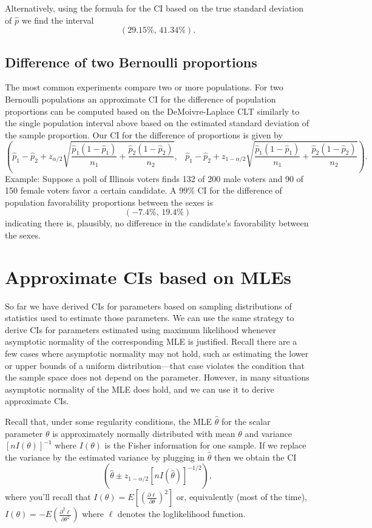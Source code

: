 \documentclass[
]{book}
\begin{document}
Alternatively, using the formula for the CI based on the true standard deviation of \(\hat p\) we find the interval
\[(29.15\%, \, 41.34\%).\]

\hypertarget{difference-of-two-bernoulli-proportions}{%
\subsection{Difference of two Bernoulli proportions}\label{difference-of-two-bernoulli-proportions}}

The most common experiments compare two or more populations. For two Bernoulli populations an approximate CI for the difference of population proportions can be computed based on the DeMoivre-Laplace CLT similarly to the single population interval above based on the estimated standard deviation of the sample proportion. Our CI for the difference of proportions is given by
\[\left(\hat p_1 - \hat p_2 + z_{\alpha/2}\sqrt{\frac{\hat p_1(1-\hat p_1)}{n_1} + \frac{\hat p_2(1-\hat p_2)}{n_2}}, \,\,\,\,\, \hat p_1 - \hat p_2 + z_{1-\alpha/2}\sqrt{\frac{\hat p_1(1-\hat p_1)}{n_1} + \frac{\hat p_2(1-\hat p_2)}{n_2}}\right).\]
Example: Suppose a poll of Illinois voters finds 132 of 200 male voters and 90 of 150 female voters favor a certain candidate. A \(99\%\) CI for the difference of population favorability proportions between the sexes is
\[(-7.4\%, \, 19.4\%)\]
indicating there is, plausibly, no difference in the candidate's favorability between the sexes.

\hypertarget{approximate-cis-based-on-mles}{%
\section{Approximate CIs based on MLEs}\label{approximate-cis-based-on-mles}}

So far we have derived CIs for parameters based on sampling distributions of statistics used to estimate those parameters. We can use the same strategy to derive CIs for parameters estimated using maximum likelihood whenever asymptotic normality of the corresponding MLE is justified. Recall there are a few cases where asymptotic normality may not hold, such as estimating the lower or upper bounds of a uniform distribution---that case violates the condition that the sample space does not depend on the parameter. However, in many situations asymptotic normality of the MLE does hold, and we can use it to derive approximate CIs.

Recall that, under some regularity conditions, the MLE \(\hat\theta\) for the scalar parameter \(\theta\) is approximately normally distributed with mean \(\theta\) and variance \([nI(\theta)]^{-1}\) where \(I(\theta)\) is the Fisher information for one sample. If we replace the variance by the estimated variance by plugging in \(\hat\theta\) then we obtain the CI
\[\left(\hat\theta \pm z_{1-\alpha/2}[nI(\hat\theta)]^{-1/2}\right),\]
where you'll recall that \(I(\theta) = E\left[\left(\frac{\partial \ell}{\partial \theta}\right)^2\right]\) or, equivalently (most of the time), \(I(\theta) = -E\left(\frac{\partial^2 \ell}{\partial \theta^2}\right)\) where \(\ell\) denotes the loglikelihood function.
\end{document}
